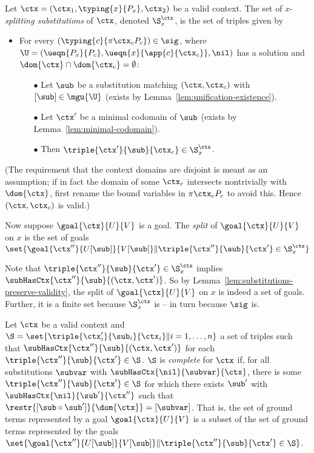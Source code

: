 \begin{definition}[Splitting]
\label{def:splitting}
Let $\ctx = (\ctx_1, \typing{x}{P_x}, \ctx_2)$ be a valid context.
The set of $x$-\emph{splitting substitutions} of $\ctx$, denoted $\S^{\ctx}_x$, is the set of triples given by
%
\begin{itemize}
	\item For every $(\typing{c}{\pi{\ctx_c}{P_c}}) \in \sig$, where $\U = (\ueqn{P_x}{P_c}, \ueqn{x}{\app{c}{\ctx_c}}, \nil)$ has a solution and $\dom{\ctx} \cap \dom{\ctx_c} = \emptyset$:
  \begin{itemize}
    \item[$\bullet$] Let $\sub$ be a substitution matching $(\ctx, \ctx_c)$ with $[\sub] \in \mgu{\U}$ (exists by Lemma~\ref{lem:unification-existence}).
    \item[$\bullet$] Let $\ctx'$ be a minimal codomain of $\sub$ (exists by Lemma~\ref{lem:minimal-codomain}).
    \item[$\bullet$] Then $\triple{\ctx'}{\sub}{\ctx_c} \in \S^{\ctx}_x$.
  \end{itemize}
\end{itemize}
%
(The requirement that the context domains are disjoint is meant as an assumption; if in fact the domain of some $\ctx_c$ intersects nontrivially with $\dom{\ctx}$, first rename the bound variables in $\pi{\ctx_c}{P_c}$ to avoid this.
Hence $(\ctx, \ctx_c)$ is valid.)

Now suppose $\goal{\ctx}{U}{V}$ is a goal.
The \emph{split} of $\goal{\ctx}{U}{V}$ on $x$ is the set of goals $\set{\goal{\ctx''}{U[\sub]}{V[\sub]} \| \triple{\ctx''}{\sub}{\ctx'} \in \S^{\ctx}_x}$
\end{definition}

Note that $\triple{\ctx''}{\sub}{\ctx'} \in \S^{\ctx}_x$ implies $\subHasCtx{\ctx''}{\sub}{(\ctx, \ctx')}$.
So by Lemma~\ref{lem:substitutions-preserve-validity}, the split of $\goal{\ctx}{U}{V}$ on $x$ is indeed a set of goals.
Further, it is a finite set because $ \S^{\ctx}_x$ is -- in turn because $\sig$ is.

\begin{definition}
\label{def:complete-substitutions}
Let $\ctx$ be a valid context and $\S = \set{\triple{\ctx_i'}{\sub_i}{\ctx_i} \| i = 1, \ldots, n}$ a set of triples such that $\subHasCtx{\ctx''}{\sub}{(\ctx, \ctx')}$ for each $\triple{\ctx''}{\sub}{\ctx'} \in \S$.
$\S$ is \emph{complete} for $\ctx$ if, for all substitutions $\subvar$ with $\subHasCtx{\nil}{\subvar}{\ctx}$, there is some $\triple{\ctx''}{\sub}{\ctx'} \in \S$ for which there exists $\sub'$ with $\subHasCtx{\nil}{\sub'}{\ctx''}$ such that $\restr{[\sub \circ \sub']}{\dom{\ctx}} = [\subvar]$.
That is, the set of ground terms represented by a goal $\goal{\ctx}{U}{V}$ is a subset of the set of ground terms represented by the goals $\set{\goal{\ctx''}{U[\sub]}{V[\sub]} \| \triple{\ctx''}{\sub}{\ctx'} \in \S}$.
\end{definition}

